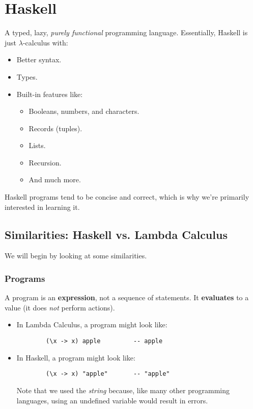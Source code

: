 \documentclass[letterpaper]{article}
\begin{document}
\section{Haskell}
A typed, lazy, \emph{purely functional} programming language. Essentially, Haskell is just $\lambda$-calculus with: 
\begin{itemize}
    \item Better syntax. 
    \item Types. 
    \item Built-in features like: 
    \begin{itemize}
        \item Booleans, numbers, and characters. 
        \item Records (tuples).
        \item Lists. 
        \item Recursion. 
        \item And much more. 
    \end{itemize}
\end{itemize}
Haskell programs tend to be concise and correct, which is why we're primarily interested in learning it. 


\subsection{Similarities: Haskell vs. Lambda Calculus}
We will begin by looking at some similarities.

\subsubsection{Programs}
A program is an \textbf{expression}, not a sequence of statements. It \textbf{evaluates} to a value (it does \emph{not} perform actions).
\begin{itemize}
    \item In Lambda Calculus, a program might look like: 
    \begin{verbatim}
        (\x -> x) apple         -- apple 
    \end{verbatim}
    \item In Haskell, a program might look like: 
    \begin{verbatim}
        (\x -> x) "apple"       -- "apple"
    \end{verbatim}
    Note that we used the \emph{string}  because, like many other programming languages, using an undefined variable would result in errors. 
\end{itemize}
\end{document}
